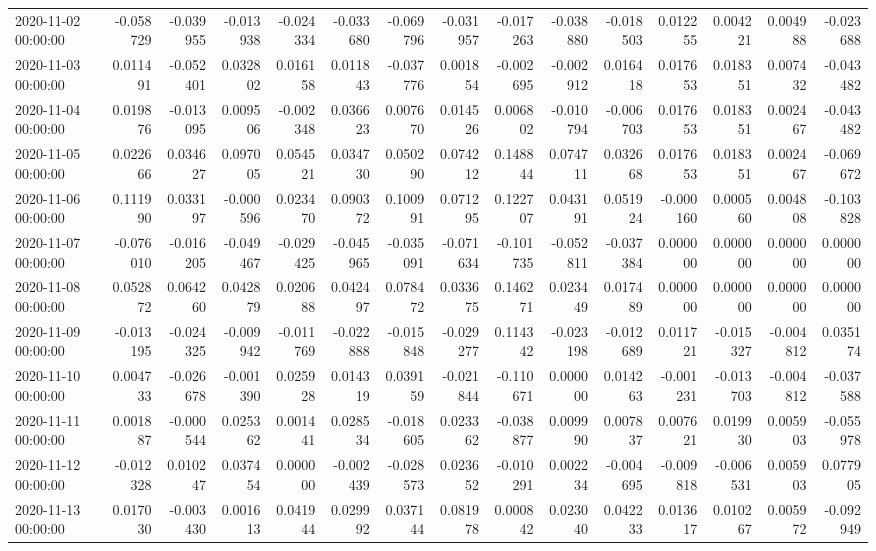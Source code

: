 \begin{tabular}{lrrrrrrrrrrrrrr}
2020-11-02 00:00:00 & -0.058729 & -0.039955 & -0.013938 & -0.024334 & -0.033680 & -0.069796 & -0.031957 & -0.017263 & -0.038880 & -0.018503 & 0.012255 & 0.004221 & 0.004988 & -0.023688 \\
2020-11-03 00:00:00 & 0.011491 & -0.052401 & 0.032802 & 0.016158 & 0.011843 & -0.037776 & 0.001854 & -0.002695 & -0.002912 & 0.016418 & 0.017653 & 0.018351 & 0.007432 & -0.043482 \\
2020-11-04 00:00:00 & 0.019876 & -0.013095 & 0.009506 & -0.002348 & 0.036623 & 0.007670 & 0.014526 & 0.006802 & -0.010794 & -0.006703 & 0.017653 & 0.018351 & 0.002467 & -0.043482 \\
2020-11-05 00:00:00 & 0.022666 & 0.034627 & 0.097005 & 0.054521 & 0.034730 & 0.050290 & 0.074212 & 0.148844 & 0.074711 & 0.032668 & 0.017653 & 0.018351 & 0.002467 & -0.069672 \\
2020-11-06 00:00:00 & 0.111990 & 0.033197 & -0.000596 & 0.023470 & 0.090372 & 0.100991 & 0.071295 & 0.122707 & 0.043191 & 0.051924 & -0.000160 & 0.000560 & 0.004808 & -0.103828 \\
2020-11-07 00:00:00 & -0.076010 & -0.016205 & -0.049467 & -0.029425 & -0.045965 & -0.035091 & -0.071634 & -0.101735 & -0.052811 & -0.037384 & 0.000000 & 0.000000 & 0.000000 & 0.000000 \\
2020-11-08 00:00:00 & 0.052872 & 0.064260 & 0.042879 & 0.020688 & 0.042497 & 0.078472 & 0.033675 & 0.146271 & 0.023449 & 0.017489 & 0.000000 & 0.000000 & 0.000000 & 0.000000 \\
2020-11-09 00:00:00 & -0.013195 & -0.024325 & -0.009942 & -0.011769 & -0.022888 & -0.015848 & -0.029277 & 0.114342 & -0.023198 & -0.012689 & 0.011721 & -0.015327 & -0.004812 & 0.035174 \\
2020-11-10 00:00:00 & 0.004733 & -0.026678 & -0.001390 & 0.025928 & 0.014319 & 0.039159 & -0.021844 & -0.110671 & 0.000000 & 0.014263 & -0.001231 & -0.013703 & -0.004812 & -0.037588 \\
2020-11-11 00:00:00 & 0.001887 & -0.000544 & 0.025362 & 0.001441 & 0.028534 & -0.018605 & 0.023362 & -0.038877 & 0.009990 & 0.007837 & 0.007621 & 0.019930 & 0.005903 & -0.055978 \\
2020-11-12 00:00:00 & -0.012328 & 0.010247 & 0.037454 & 0.000000 & -0.002439 & -0.028573 & 0.023652 & -0.010291 & 0.002234 & -0.004695 & -0.009818 & -0.006531 & 0.005903 & 0.077905 \\
2020-11-13 00:00:00 & 0.017030 & -0.003430 & 0.001613 & 0.041944 & 0.029992 & 0.037144 & 0.081978 & 0.000842 & 0.023040 & 0.042233 & 0.013617 & 0.010267 & 0.005972 & -0.092949 \\

\end{tabular}

